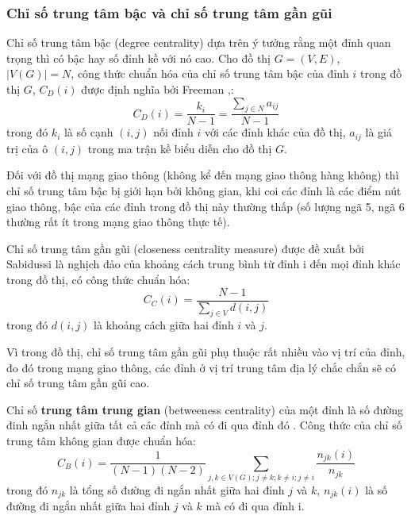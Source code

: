\documentclass[14pt, oneside, a4paper, openany]{scrartcl}
\begin{document}


\subsubsection{Chỉ số trung tâm bậc và chỉ số trung tâm gần gũi}
Chỉ số trung tâm bậc (degree centrality) dựa trên ý tưởng rằng một đỉnh quan trọng thì có bậc hay số đỉnh kề với nó cao. Cho đồ thị $G=(V,E)$, $|V(G)| = N$, công thức chuẩn hóa của chỉ số trung tâm bậc của đỉnh $i$ trong đồ thị $G$, $C_D(i)$ được định nghĩa bởi Freeman \cite{centrali01},\cite{centrali02}:
\begin{equation}
	C_D(i) = \frac{k_i}{N-1} = \frac{\sum_{j \in N}a_{ij}}{N-1}
\end{equation}
trong đó $k_i$ là số cạnh $(i,j)$ nối đỉnh $i$ với các đỉnh khác của đồ thị, $a_{ij}$ là giá trị của ô $(i,j)$ trong ma trận kề biểu diễn cho đồ thị $G$.

Đối với đồ thị mạng giao thông (không kể đến mạng giao thông hàng không) thì chỉ số trung tâm bậc bị giới hạn bởi không gian, khi coi các đỉnh là các điểm nút giao thông, bậc của các đỉnh trong đồ thị này thường thấp (số lượng ngã 5, ngã 6 thường rất ít trong mạng giao thông thực tế).

Chỉ số trung tâm gần gũi (closeness centrality measure) được đề xuất bởi Sabidussi \cite{centrali03} là nghịch đảo của khoảng cách trung bình từ đỉnh i đến mọi đỉnh khác trong đồ thị, có công thức chuẩn hóa:
\begin{equation}
C_C(i) = \frac{N-1}{\sum_{j \in V} d(i,j)}
\end{equation}
trong đó $d(i,j)$ là khoảng cách giữa hai đỉnh $i$ và $j$.

Vì trong đồ thị, chỉ số trung tâm gần gũi phụ thuộc rất nhiều vào vị trí của đỉnh, đo đó trong mạng giao thông, các đỉnh ở vị trí trung tâm địa lý chắc chắn sẽ có chỉ số trung tâm gần gũi cao.

Chỉ số \textbf{trung tâm trung gian}  (betweeness centrality) của một đỉnh là số đường đinh ngắn nhất giữa tất cả các đỉnh mà có đi qua đỉnh đó \cite{centrali02}. Công thức của chỉ số trung tâm không gian được chuẩn hóa:
\begin{equation}
	C_B(i) = \frac{1}{(N-1)(N-2)} \sum_{j,k \in V(G); j \neq k; k\neq i; j \neq i} \frac{n_{jk}(i)}{n_{jk}}
\end{equation}
trong đó $n_{jk}$ là tổng số đường đi ngắn nhất giữa hai đỉnh $j$ và $k$, $n_{jk}(i)$ là số đường đi ngắn nhất giữa hai đỉnh $j$ và $k$ mà có đi qua đỉnh i.
\end{document}
